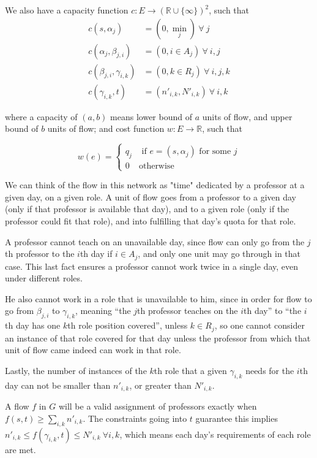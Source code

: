 We also have a capacity function $c:E \to \left(\mathbb{R} \cup \{\infty\}\right)^2$, such that
\begin{align*}
  c(s, \alpha_j) &= (0, \textstyle\min_j)\ \forall\ j\\
  c(\alpha_j, \beta_{j, i}) &= (0, i \in A_j)\ \forall\ i, j\\
  c(\beta_{j, i}, \gamma_{i, k}) &= (0, k \in R_j)\ \forall\ i, j, k\\
  c(\gamma_{i, k}, t) &= (n'_{i, k}, N'_{i, k})\ \forall\ i, k
\end{align*}

where a capacity of $(a, b)$ means lower bound of $a$ units of flow, and upper bound of $b$ units of flow; and cost function $w:E \to \mathbb{R}$, such that

$$
w(e) =
\begin{cases}
q_j &\text{ if } e = (s, \alpha_j) \text{ for some }j\\
0 & \text{otherwise}
\end{cases}
$$

We can think of the flow in this network as "time" dedicated by a professor at a given day, on a given role. A unit of flow goes from a professor to a given day (only if that professor is available that day), and to a given role (only if the professor could fit that role), and into fulfilling that day's quota for that role.

A professor cannot teach on an unavailable day, since flow can only go from the $j$th professor to the $i$th day if $i \in A_j$, and only one unit may go through in that case. This last fact ensures a professor cannot work twice in a single day, even under different roles.

He also cannot work in a role that is unavailable to him, since in order for flow to go from $\beta_{j, i}$ to $\gamma_{i, k}$, meaning ``the $j$th professor teaches on the $i$th day'' to ``the $i$th day has one $k$th role position covered'', unless $k \in R_j$, so one cannot consider an instance of that role covered for that day unless the professor from which that unit of flow came indeed can work in that role.

Lastly, the number of instances of the $k$th role that a given $\gamma_{i, k}$ needs for the $i$th day can not be smaller than $n'_{i, k}$, or greater than $N'_{i, k}$.

A flow $f$ in $G$ will be a valid assignment of professors exactly when $f(s, t) \ge \sum_{i, k} n'_{i, k}$. The constraints going into $t$ guarantee this implies $n'_{i, k} \le f(\gamma_{i, k}, t) \le N'_{i, k}\ \forall i, k$, which means each day's requirements of each role are met.

